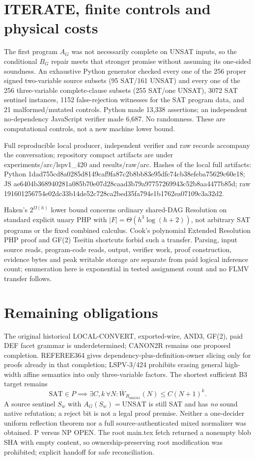 \documentclass[11pt]{article}
\begin{document}
\section*{ITERATE, finite controls and physical costs}
The first program \(A_G\) was not necessarily complete on UNSAT inputs, so the conditional \(B_G\) repair meets that stronger promise without assuming its one-sided soundness. An exhaustive Python generator checked every one of the 256 proper signed two-variable source subsets (95 SAT/161 UNSAT) and every one of the 256 three-variable complete-clause subsets (255 SAT/one UNSAT), 3072 SAT sentinel instances, 1152 false-rejection witnesses for the SAT program data, and 21 malformed/mutated controls. Python made 13,338 assertions; an independent no-dependency JavaScript verifier made 6,687. No randomness. These are computational controls, not a new machine lower bound.

Full reproducible local producer, independent verifier and raw records accompany the conversation; repository compact artifacts are under experiments/arc/lspv1_420 and results/raw/arc. Hashes of the local full artifacts: Python 1dad755cd8a0285d8149caf9fa87c2b8bb83e95dfc74cb38efeba75629c60e18; JS ae6404b368940281a085b70e07d28caad3b79a97757269943c52b8aa4477b85d; raw 191601256754e02dc33b14de52c728ca2bed35fa794e1b1762ea07109c3a32d2.

Haken's \(2^{\Omega(h)}\) lower bound concerns ordinary shared-DAG Resolution on standard explicit unary PHP with \(|F|=\Theta(h^3\log(h+2))\), not arbitrary SAT programs or the fixed combined calculus. Cook's polynomial Extended Resolution PHP proof and GF(2) Tseitin shortcuts forbid such a transfer. Parsing, input source reads, program-code reads, output, verifier work, proof construction, evidence bytes and peak writable storage are separate from paid logical inference count; enumeration here is exponential in tested assignment count and no FLMV transfer follows.

\section*{Remaining obligations}
The original historical LOCAL-CONVERT, exported-wire, AND3, GF(2), paid DEF facet grammar is underdetermined; CANON2R remains one proposed completion. REFEREE364 gives dependency-plus-definition-owner slicing only for proofs already in that completion; LSPV-3/424 prohibits erasing general high-width affine semantics into only three-variable factors. The shortest sufficient B3 target remains
\[
\mathrm{SAT}\in P\implies\exists C,k\,\forall N:
\overline W_{R_{\mathrm{mix341}}}(N)\le C(N+1)^k.
\]
A source sentinel \(S_w\) with \(A_G(S_w)=\mathrm{UNSAT}\) is still SAT and has \emph{no} sound native refutation; a reject bit is not a legal proof premise. Neither a one-decider uniform reflection theorem nor a full source-authenticated mixed normalizer was obtained. P versus NP OPEN. The root main.tex fetch returned a nonempty blob SHA with empty content, so ownership-preserving root modification was prohibited; explicit handoff for safe reconciliation.
\end{document}
